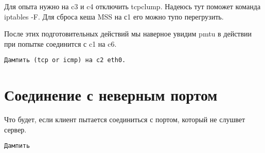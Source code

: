 \documentclass[a4paper,12pt]{article}
\begin{document}
Для опыта нужно на c3 и c4 отключить tcpclump.
Надеюсь тут поможет команда iptables -F.
Для сброса кеша MSS на с1 его можно тупо перегрузить.

После этих подготовительных действий мы наверное увидим pmtu в действии при попытке соединится с c1 на c6.

\begin{Verbatim}
Дампить (tcp or icmp) на c2 eth0.
\end{Verbatim}

\section{Соединение с неверным портом}

Что будет, если клиент пытается соединиться с портом, который не слушвет сервер.

\begin{Verbatim}
Дампить
\end{Verbatim}
\end{document}
